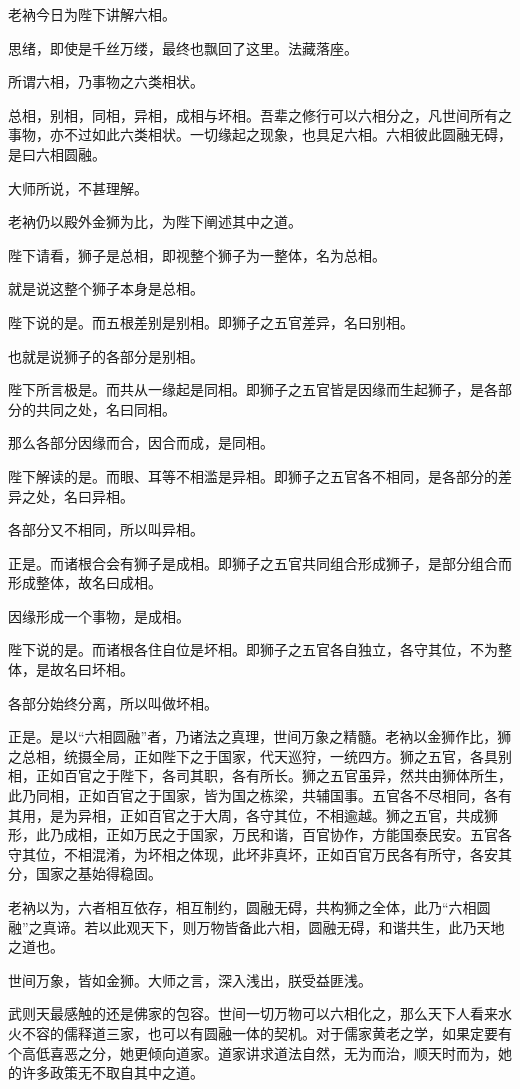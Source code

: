 \documentclass[UTF8,openany]{ctexbook}
\begin{document}
老衲今日为陛下讲解六相。\cite{ref6}

思绪，即使是千丝万缕，最终也飘回了这里。法藏落座。

所谓六相，乃事物之六类相状。

总相，别相，同相，异相，成相与坏相。吾辈之修行可以六相分之，凡世间所有之事物，亦不过如此六类相状。一切缘起之现象，也具足六相。六相彼此圆融无碍，是曰六相圆融。

大师所说，不甚理解。

老衲仍以殿外金狮为比，为陛下阐述其中之道。

陛下请看，狮子是总相，即视整个狮子为一整体，名为总相。

就是说这整个狮子本身是总相。

陛下说的是。而五根差别是别相。即狮子之五官差异，名曰别相。

也就是说狮子的各部分是别相。

陛下所言极是。而共从一缘起是同相。即狮子之五官皆是因缘而生起狮子，是各部分的共同之处，名曰同相。

那么各部分因缘而合，因合而成，是同相。

陛下解读的是。而眼、耳等不相滥是异相。即狮子之五官各不相同，是各部分的差异之处，名曰异相。

各部分又不相同，所以叫异相。

正是。而诸根合会有狮子是成相。即狮子之五官共同组合形成狮子，是部分组合而形成整体，故名曰成相。

因缘形成一个事物，是成相。

陛下说的是。而诸根各住自位是坏相。即狮子之五官各自独立，各守其位，不为整体，是故名曰坏相。

各部分始终分离，所以叫做坏相。

正是。是以“六相圆融”者，乃诸法之真理，世间万象之精髓。老衲以金狮作比，狮之总相，统摄全局，正如陛下之于国家，代天巡狩，一统四方。狮之五官，各具别相，正如百官之于陛下，各司其职，各有所长。狮之五官虽异，然共由狮体所生，此乃同相，正如百官之于国家，皆为国之栋梁，共辅国事。五官各不尽相同，各有其用，是为异相，正如百官之于大周，各守其位，不相逾越。狮之五官，共成狮形，此乃成相，正如万民之于国家，万民和谐，百官协作，方能国泰民安。五官各守其位，不相混淆，为坏相之体现，此坏非真坏，正如百官万民各有所守，各安其分，国家之基始得稳固。

老衲以为，六者相互依存，相互制约，圆融无碍，共构狮之全体，此乃“六相圆融”之真谛。若以此观天下，则万物皆备此六相，圆融无碍，和谐共生，此乃天地之道也。

世间万象，皆如金狮。大师之言，深入浅出，朕受益匪浅。

武则天最感触的还是佛家的包容。世间一切万物可以六相化之，那么天下人看来水火不容的儒释道三家，也可以有圆融一体的契机。对于儒家黄老之学，如果定要有个高低喜恶之分，她更倾向道家。道家讲求道法自然，无为而治，顺天时而为，她的许多政策无不取自其中之道。
\end{document}
